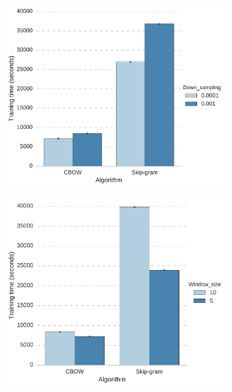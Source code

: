 \documentclass[12pt]{report}
\begin{document}
\begin{figure}
	\centering
	\begin{subfigure}[b]{0.49\textwidth}
		\includegraphics[width=0.9\textwidth]{./Figures/TrainTime-Down_sampling.pdf}
		\caption{}
		\label{fig:ws}
	\end{subfigure}
	\begin{subfigure}[b]{0.49\textwidth}
		\centering
		\includegraphics[width=0.9\textwidth]{./Figures/TrainTime-Window_size.pdf}
		\caption{}
		\label{fig:ds}
	\end{subfigure}\\
	\begin{subfigure}[b]{0.49\textwidth}
		\centering

\end{subfigure}
\end{figure}
\end{document}

